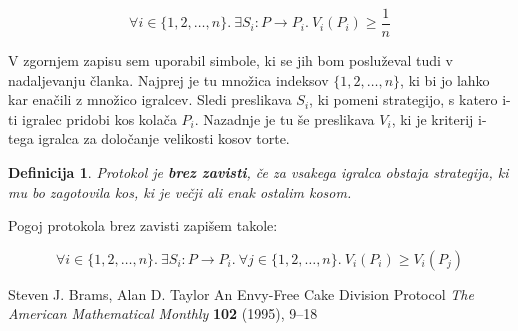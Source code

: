 \documentclass[a4paper, 12pt]{article}
\newtheorem{definicija}{Definicija}
\begin{document}
	$$
	\forall i \in \{1, 2, \ldots, n\}.\ \exists S_i: P \rightarrow P_i.\ V_i (P_i) \geq \frac{1}{n}
	$$
	
	V zgornjem zapisu sem uporabil simbole, ki se jih bom posluževal tudi v nadaljevanju članka. Najprej je tu množica indeksov $\{1, 2, \ldots, n\}$, ki bi jo lahko kar enačili z množico igralcev. Sledi preslikava $S_i$, ki pomeni strategijo, s katero i-ti igralec pridobi kos kolača $P_i$. Nazadnje je tu še preslikava $V_i$, ki je kriterij i-tega igralca za določanje velikosti kosov torte.

	\begin{definicija}
		Protokol je \textbf{brez zavisti}, če za vsakega igralca obstaja strategija, ki mu bo zagotovila kos, ki je večji ali enak ostalim kosom. 
	\end{definicija}

	Pogoj protokola brez zavisti zapišem takole:
	
	$$
	\forall i \in \{1, 2, \ldots, n\}.\ \exists S_i: P \rightarrow P_i.\ \forall j \in \{1, 2, \ldots, n\}.\ V_i (P_i) \geq V_i (P_j)
	$$
	
	\begin{thebibliography}{5}
		
		Steven J. Brams, Alan D. Taylor
		An Envy-Free Cake Division Protocol
		\textit{The American Mathematical Monthly} \textbf{102} (1995), 9–18
		
	\end{thebibliography}
	
\end{document}
